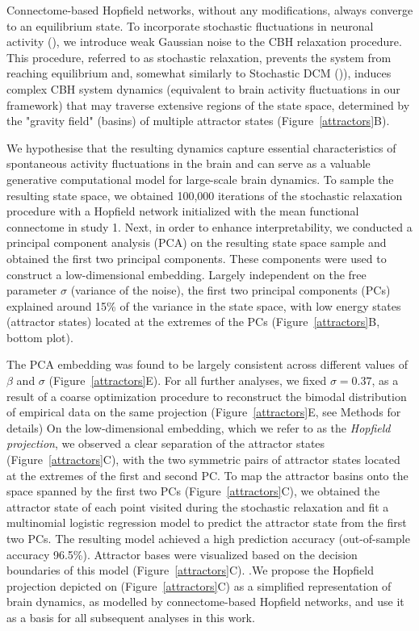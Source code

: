 \documentclass{article}
\begin{document}
Connectome-based Hopfield networks, without any modifications, always converge to an equilibrium state.
To incorporate stochastic fluctuations in neuronal activity (\cite{Robinson_2005}), we introduce weak Gaussian noise to the CBH relaxation procedure. This procedure, referred to as stochastic relaxation, prevents the system from reaching equilibrium and, somewhat similarly to Stochastic DCM (\cite{Daunizeau_2012})), induces complex CBH system dynamics  (equivalent to brain activity fluctuations in our framework) that may traverse extensive regions of the state space, determined by the "gravity field" (basins) of multiple attractor states (Figure~\ref{attractors}B).

We hypothesise that the resulting dynamics capture essential characteristics of spontaneous activity fluctuations in the brain and can serve as a valuable generative computational model for large-scale brain dynamics.
To sample the resulting state space, we obtained 100,000 iterations of the stochastic relaxation procedure with a Hopfield network initialized with the mean functional connectome in study 1.
Next, in order to enhance interpretability, we conducted a principal component analysis (PCA) on the resulting state space sample and obtained the first two principal components. These components were used to construct a low-dimensional embedding.
Largely independent on the free parameter $\sigma$ (variance of the noise), the first two principal components (PCs) explained around 15\% of the variance in the state space, with low energy states (attractor states) located at the extremes of the PCs (Figure~\ref{attractors}B, bottom plot).


The PCA embedding was found to be largely consistent across different values of $\beta$ and $\sigma$ (Figure~\ref{attractors}E). For all further analyses, we fixed $\sigma=0.37$, as a result of a coarse optimization procedure to reconstruct the bimodal distribution of empirical data on the same projection (Figure~\ref{attractors}E, see Methods for details)
On the low-dimensional embedding, which we refer to as the \textit{Hopfield projection}, we observed a clear separation of the attractor states (Figure~\ref{attractors}C), with the two symmetric pairs of attractor states located at the extremes of the first and second PC.
To map the attractor basins onto the space spanned by the first two PCs (Figure~\ref{attractors}C), we obtained the attractor state of each point visited during the stochastic relaxation and fit a multinomial logistic regression model to predict the attractor state from the first two PCs. The resulting model achieved a high prediction accuracy (out-of-sample accuracy 96.5\%). Attractor bases were visualized based on the decision boundaries of this  model (Figure~\ref{attractors}C).
.We propose the Hopfield projection depicted on (Figure~\ref{attractors}C) as a simplified representation of brain dynamics, as modelled by connectome-based Hopfield networks, and use it as a basis for all subsequent analyses in this work.
\end{document}
